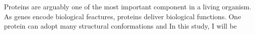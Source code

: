 Proteins are arguably one of the most important component in a living organism. As genes encode biological feactures, proteins deliver biological functions. One protein can adopt many structural conformations and   In this study, I will be 